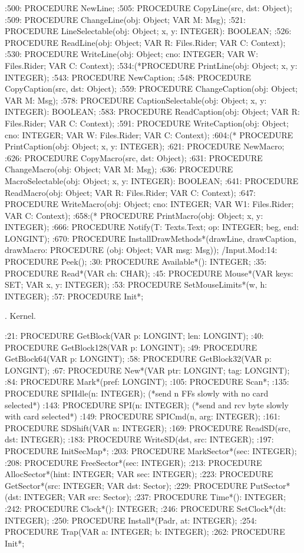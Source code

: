 :500:  PROCEDURE NewLine;
:505:  PROCEDURE CopyLine(src, dst: Object);
:509:  PROCEDURE ChangeLine(obj: Object; VAR M: Msg);
:521:  PROCEDURE LineSelectable(obj: Object; x, y: INTEGER): BOOLEAN;
:526:  PROCEDURE ReadLine(obj: Object; VAR R: Files.Rider; VAR C: Context);
:530:  PROCEDURE WriteLine(obj: Object; cno: INTEGER; VAR W: Files.Rider; VAR C: Context);
:534:(*PROCEDURE PrintLine(obj: Object; x, y: INTEGER);
:543:  PROCEDURE NewCaption;
:548:  PROCEDURE CopyCaption(src, dst: Object);
:559:  PROCEDURE ChangeCaption(obj: Object;  VAR M: Msg);
:578:  PROCEDURE CaptionSelectable(obj: Object; x, y: INTEGER): BOOLEAN;
:583:  PROCEDURE ReadCaption(obj: Object; VAR R: Files.Rider; VAR C: Context);
:591:  PROCEDURE WriteCaption(obj: Object; cno: INTEGER; VAR W: Files.Rider; VAR C: Context);
:604:(*  PROCEDURE PrintCaption(obj: Object; x, y: INTEGER);
:621:  PROCEDURE NewMacro;
:626:  PROCEDURE CopyMacro(src, dst: Object);
:631:  PROCEDURE ChangeMacro(obj: Object; VAR M: Msg);
:636:  PROCEDURE MacroSelectable(obj: Object; x, y: INTEGER): BOOLEAN;
:641:  PROCEDURE ReadMacro(obj: Object; VAR R: Files.Rider; VAR C: Context);
:647:  PROCEDURE WriteMacro(obj: Object; cno: INTEGER; VAR W1: Files.Rider; VAR C: Context);
:658:(*  PROCEDURE PrintMacro(obj: Object; x, y: INTEGER);
:666:  PROCEDURE Notify(T: Texts.Text; op: INTEGER; beg, end: LONGINT);
:670:  PROCEDURE InstallDrawMethods*(drawLine, drawCaption, drawMacro: PROCEDURE (obj: Object; VAR msg: Msg));
/Input.Mod:14:  PROCEDURE Peek();
:30:  PROCEDURE Available*(): INTEGER;
:35:  PROCEDURE Read*(VAR ch: CHAR);
:45:  PROCEDURE Mouse*(VAR keys: SET; VAR x, y: INTEGER);
:53:  PROCEDURE SetMouseLimits*(w, h: INTEGER);
:57:  PROCEDURE Init*;

. Kernel.

:21:  PROCEDURE GetBlock(VAR p: LONGINT; len: LONGINT);
:40:  PROCEDURE GetBlock128(VAR p: LONGINT);
:49:  PROCEDURE GetBlock64(VAR p: LONGINT);
:58:  PROCEDURE GetBlock32(VAR p: LONGINT);
:67:   PROCEDURE New*(VAR ptr: LONGINT; tag: LONGINT);
:84:  PROCEDURE Mark*(pref: LONGINT);
:105:  PROCEDURE Scan*;
:135:  PROCEDURE SPIIdle(n: INTEGER); (*send n FFs slowly with no card selected*)
:143:  PROCEDURE SPI(n: INTEGER); (*send and rcv byte slowly with card selected*)
:149:  PROCEDURE SPICmd(n, arg: INTEGER);
:161:  PROCEDURE SDShift(VAR n: INTEGER);
:169:  PROCEDURE ReadSD(src, dst: INTEGER);
:183:  PROCEDURE WriteSD(dst, src: INTEGER);
:197:  PROCEDURE InitSecMap*;
:203:  PROCEDURE MarkSector*(sec: INTEGER);
:208:  PROCEDURE FreeSector*(sec: INTEGER);
:213:  PROCEDURE AllocSector*(hint: INTEGER; VAR sec: INTEGER);
:223:  PROCEDURE GetSector*(src: INTEGER; VAR dst: Sector);
:229:  PROCEDURE PutSector*(dst: INTEGER; VAR src: Sector);
:237:  PROCEDURE Time*(): INTEGER;
:242:  PROCEDURE Clock*(): INTEGER;
:246:  PROCEDURE SetClock*(dt: INTEGER);
:250:  PROCEDURE Install*(Padr, at: INTEGER);
:254:  PROCEDURE Trap(VAR a: INTEGER; b: INTEGER);
:262:  PROCEDURE Init*;

